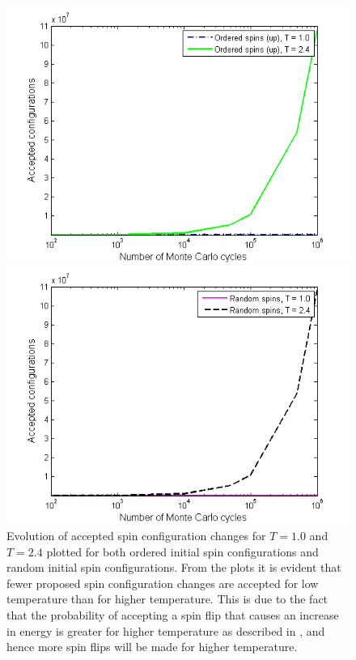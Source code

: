 \begin{figure}[H]
\centering
\begin{minipage}{.5\textwidth}
  \centering
  \includegraphics[width=1\linewidth]{Figures/AcceptMC_ordered_spins_10_24.png}
\end{minipage}%
\begin{minipage}{.5\textwidth}
  \centering
  \includegraphics[width=1\linewidth]{Figures/AcceptMC_random_spins_10_24.png}
\end{minipage}
\caption{
Evolution of accepted spin configuration changes for $T=1.0$ and $T=2.4$ plotted for both ordered initial spin configurations and random initial spin configurations. 
From the plots it is evident that fewer proposed spin configuration changes are accepted for low temperature than for higher temperature. 
This is due to the fact that the probability of accepting a spin flip that causes an increase in energy is greater for higher temperature as described in , and hence more spin flips will be made for higher temperature.  
}
\label{fig:AcceptedConfigurations2}
\end{figure}